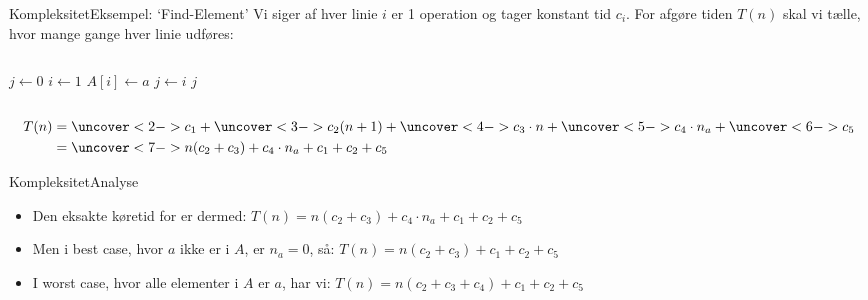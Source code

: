 \documentclass{beamer}
\begin{document}
\begin{frame}{Kompleksitet}{Eksempel: `Find-Element'}
    Vi siger af hver linie $i$ er 1 operation og tager \alert{konstant} tid $c_i$.
    For afgøre tiden $T(n)$ skal vi tælle, hvor mange gange hver linie udføres:

    \begin{columns}
        \begin{codebox}
            \li $j \gets 0$
            \li \For $i \gets 1$ \To {} \Do 
                \li \If $A[i] \gets a$ \Then 
                    \li $j \gets i$
                \End
            \End
            \li \Return $j$
        \end{codebox}
        
        \begin{codebox}
            \zi {}
            \zi {}
            \zi {}
            \zi {}
            \zi {}
        \end{codebox}
    \end{columns}

    \begin{align*}
        T(n)&= \uncover<2->{c_1} + \uncover<3->{c_2(n + 1)} + \uncover<4->{c_3
        \cdot n}
        + \uncover<5->{c_4 \cdot n_a} + \uncover<6->{c_5} \\
            &= \uncover<7->{n(c_2 + c_3) + c_4 \cdot n_a + c_1 + c_2 + c_5}
    \end{align*}

\end{frame}

\begin{frame}{Kompleksitet}{Analyse}

    \begin{itemize}
        \item Den \alert{eksakte} køretid for  er dermed:
            $T(n) = n(c_2 + c_3) + c_4 \cdot n_a + c_1 + c_2 + c_5$
            \pause \medskip
        \item Men i \alert{best case}, hvor $a$ ikke er i $A$, er $n_a = 0$, så:
            $T(n) = n(c_2 + c_3) + c_1 + c_2 + c_5$
            \pause \medskip
        \item I \alert{worst case}, hvor alle elementer i $A$ er $a$, har vi:
            $T(n) = n(c_2 + c_3 + c_4) + c_1 + c_2 + c_5$
    \end{itemize}
    
\end{frame}
\end{document}
